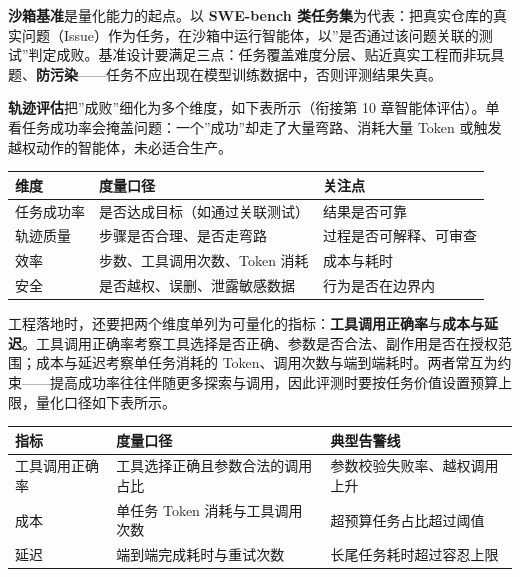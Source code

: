 \documentclass[
]{ctexbook}
\newcounter{none}
\begin{document}
\textbf{沙箱基准}是量化能力的起点。以 \textbf{SWE-bench
类任务集}为代表：把真实仓库的真实问题（Issue）作为任务，在沙箱中运行智能体，以''是否通过该问题关联的测试''判定成败。基准设计要满足三点：任务覆盖难度分层、贴近真实工程而非玩具题、\textbf{防污染}------任务不应出现在模型训练数据中，否则评测结果失真。

\textbf{轨迹评估}把''成败''细化为多个维度，如下表所示（衔接第 10
章智能体评估）。单看任务成功率会掩盖问题：一个''成功''却走了大量弯路、消耗大量
Token 或触发越权动作的智能体，未必适合生产。

{\def\LTcaptype{none} %
\begin{longtable}[]{@{}lll@{}}
\toprule\noalign{}
维度 & 度量口径 & 关注点 \\
\midrule\noalign{}
\endhead
\bottomrule\noalign{}
\endlastfoot
任务成功率 & 是否达成目标（如通过关联测试） & 结果是否可靠 \\
轨迹质量 & 步骤是否合理、是否走弯路 & 过程是否可解释、可审查 \\
效率 & 步数、工具调用次数、Token 消耗 & 成本与耗时 \\
安全 & 是否越权、误删、泄露敏感数据 & 行为是否在边界内 \\
\end{longtable}
}

工程落地时，还要把两个维度单列为可量化的指标：\textbf{工具调用正确率}与\textbf{成本与延迟}。工具调用正确率考察工具选择是否正确、参数是否合法、副作用是否在授权范围；成本与延迟考察单任务消耗的
Token、调用次数与端到端耗时。两者常互为约束------提高成功率往往伴随更多探索与调用，因此评测时要按任务价值设置预算上限，量化口径如下表所示。

{\def\LTcaptype{none} %
\begin{longtable}[]{@{}
  >{\raggedright\arraybackslash}p{}
  >{\raggedright\arraybackslash}p{}
  >{\raggedright\arraybackslash}p{}@{}}
\toprule\noalign{}
\begin{minipage}[b]{\linewidth}\raggedright
指标
\end{minipage} & \begin{minipage}[b]{\linewidth}\raggedright
度量口径
\end{minipage} & \begin{minipage}[b]{\linewidth}\raggedright
典型告警线
\end{minipage} \\
\midrule\noalign{}
\endhead
\bottomrule\noalign{}
\endlastfoot
工具调用正确率 & 工具选择正确且参数合法的调用占比 &
参数校验失败率、越权调用上升 \\
成本 & 单任务 Token 消耗与工具调用次数 & 超预算任务占比超过阈值 \\
延迟 & 端到端完成耗时与重试次数 & 长尾任务耗时超过容忍上限 \\
\end{longtable}
}
\end{document}
